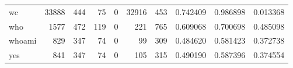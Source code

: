 \begin{tabular}{lrrrrrrrrr}
wc        &                               33888 &                                             444 &                                             75 &                                             0 &                                          32916 &                                          453 &                                           0.742409 &                               0.986898 &                             0.013368 \\
who       &                                1577 &                                             472 &                                            119 &                                             0 &                                            221 &                                          765 &                                           0.609068 &                               0.700698 &                             0.485098 \\
whoami    &                                 829 &                                             347 &                                             74 &                                             0 &                                             99 &                                          309 &                                           0.484620 &                               0.581423 &                             0.372738 \\
yes       &                                 841 &                                             347 &                                             74 &                                             0 &                                            105 &                                          315 &                                           0.490190 &                               0.587396 &                             0.374554 \\
\bottomrule
\end{tabular}
